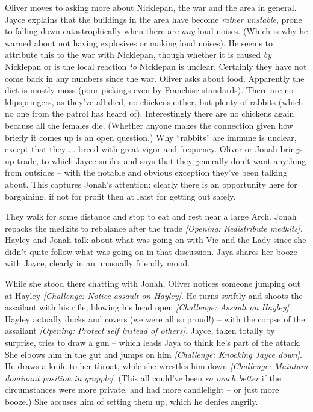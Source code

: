 Oliver moves to asking more about Nicklepan, the war and the area in general.  Jayce explains that the buildings in the area have become\textit{ rather unstable}, prone to falling down catastrophically when there are\textit{ any} loud noises.  (Which is why he warned about not having explosives or making loud noises).  He seems to attribute this to the war with Nicklepan, though whether it is caused\textit{ by} Nicklepan or is the local reaction\textit{ to} Nicklepan is unclear.  Certainly they have not come back in any numbers since the war.  Oliver asks about food.  Apparently the diet is mostly moss (poor pickings even by Franchise standards).  There are no klipspringers, as they've all died, no chickens either, but plenty of rabbits (which no one from the patrol has heard of).  Interestingly there are no chickens again because all the females die.  (Whether anyone makes the connection given how briefly it comes up is an open question.)  Why ``rabbits'' are immune is unclear, except that they ... breed with great vigor and frequency.   Oliver or Jonah brings up trade, to which Jayce smiles and says that they generally don't want anything from outsides – with the notable and obvious exception they've been talking about.  This captures Jonah's attention: clearly there is an opportunity here for bargaining, if not for profit then at least for getting out safely.



They walk for some distance and stop to eat and rest near a large Arch.  Jonah repacks the medkits to rebalance after the trade\textit{ {[}Opening: Redistribute medkits{]}.}  Hayley and Jonah talk about what was going on with Vic and the Lady since she didn't quite follow what was going on in that discussion.   Jaya shares her booze with Jayce, clearly in an unusually friendly mood.



While she stood there chatting with Jonah, Oliver notices someone jumping out at Hayley\textit{ {[}Challenge: Notice assault on Hayley{]}}.  He turns swiftly and shoots the assailant with his rifle, blowing his head open\textit{ {[}Challenge: Assault on Hayley{]}}.  Hayley actually ducks and covers (we were all so proud!) – with the corpse of the assailant\textit{ {[}Opening: Protect self instead of others{]}.}  Jayce, taken totally by surprise, tries to draw a gun – which leads Jaya to think he's part of the attack.  She elbows him in the gut and jumps on him\textit{ {[}Challenge: Knocking Jayce down{]}}.  He draws a knife to her throat, while she wrestles him down\textit{ {[}Challenge: Maintain dominant position in grapple{]}}.  (This all could've been\textit{ so much better} if the circumstances were more private, and had more candlelight – or just more booze.)  She accuses him of setting them up, which he denies angrily.



